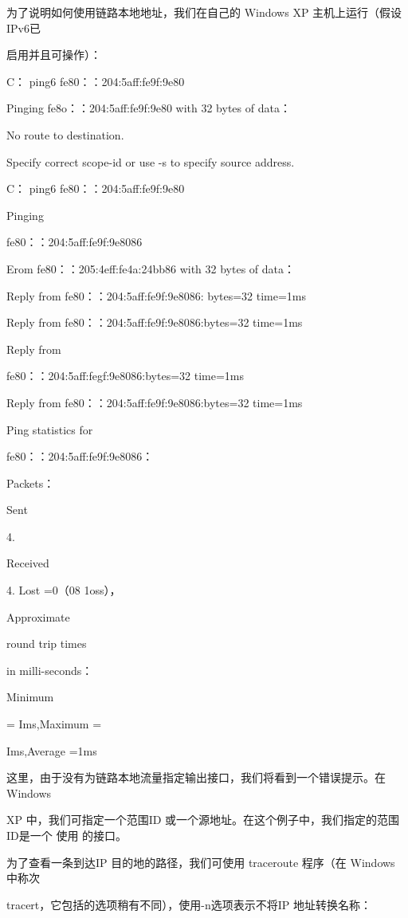 为了说明如何使用链路本地地址，我们在自己的 Windows XP 主机上运行（假设IPv6已

启用并且可操作）：

C：\> ping6 fe80：：204:5aff:fe9f:9e80

Pinging fe8o：：204:5aff:fe9f:9e80 with 32 bytes of data：

No route to destination.

Specify correct scope-id or use -s to specify source address.



C：\> ping6 fe80：：204:5aff:fe9f:9e80%

Pinging

fe80：：204:5aff:fe9f:9e8086

Erom fe80：：205:4eff:fe4a:24bb86 with 32 bytes of data：

Reply from fe80：：204:5aff:fe9f:9e8086: bytes=32 time=1ms

Reply from fe80：：204:5aff:fe9f:9e8086:bytes=32 time=1ms

Reply from

fe80：：204:5aff:fegf:9e8086:bytes=32 time=1ms

Reply from fe80：：204:5aff:fe9f:9e8086:bytes=32 time=1ms

Ping statistics for

fe80：：204:5aff:fe9f:9e8086：

Packets：

Sent

4.

Received

4. Lost =0（08 1oss），

Approximate

round trip times

in milli-seconds：

Minimum

= Ims,Maximum =

Ims,Average =1ms

这里，由于没有为链路本地流量指定输出接口，我们将看到一个错误提示。在 Windows

XP 中，我们可指定一个范围ID 或一个源地址。在这个例子中，我们指定的范围ID是一个
使用%
的接口。

为了查看一条到达IP 目的地的路径，我们可使用 traceroute 程序（在 Windows 中称次

tracert，它包括的选项稍有不同），使用-n选项表示不将IP 地址转换名称：

